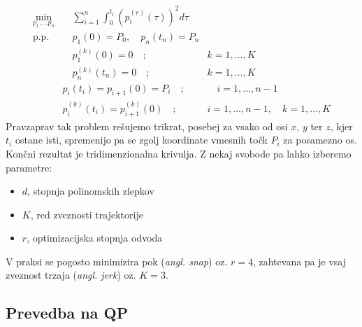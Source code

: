\documentclass[isrm2, tisk]{fmfdelo}
\begin{document}
\begin{equation}
\label{eq:functional}
\begin{aligned}
    \min_{p_1, \ldots p_n}& \quad \sum_{i=1}^n \int_0^{t_i} (p_i^{(r)}(\tau))^2 d\tau \\
    \text{p.p.} & \quad p_1(0) = P_0, \quad p_n(t_n) = P_n& \\
    & \quad p^{(k)}_1(0) = 0 \quad ; \quad &k = 1, \ldots, K \\
     &\quad p^{(k)}_n(t_n) = 0 \quad ; \quad &k = 1, \ldots, K \\
     \quad &p_i(t_i) = p_{i+1}(0) = P_i \quad ;& \quad i = 1, \ldots , n-1 \\
     \quad &p_i^{(k)}(t_i) = p_{i+1}^{(k)}(0) \quad ; \quad &i = 1, \ldots, n-1,\quad k = 1, \ldots, K 
\end{aligned}
\end{equation}
Pravzaprav tak problem rešujemo trikrat, posebej za vsako od osi $x$, $y$ ter $z$, kjer $t_i$ ostane isti, spremenijo pa se zgolj koordinate vmesnih točk $P_i$ za posamezno os. Končni rezultat je tridimenzionalna krivulja. Z nekaj svobode pa lahko izberemo parametre:
\begin{itemize}
    \item $d$, stopnja polinomskih zlepkov
    \item $K$, red zveznosti trajektorije
    \item $r$, optimizacijska stopnja odvoda
\end{itemize}

V praksi se pogosto minimizira pok (\textit{angl. snap}) oz. $r=4$, zahtevana pa je vsaj zveznost trzaja (\textit{angl. jerk}) oz. $K = 3$.

\subsection{Prevedba na \acs{QP}}
\label{sec:prevedba}
\end{document}
